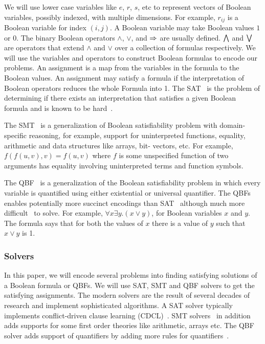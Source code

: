 \noindent We will use lower case variables like $e$, $r$, $s$, etc to represent vectors of
Boolean variables, possibly indexed, with multiple dimensions.
%
For example, $r_{ij}$ is a Boolean variable for index $(i,j)$.
%
%
A Boolean variable may take Boolean values $1$ or $0$.
%
The binary Boolean operators $\land$, $\lor$, and $\Rightarrow$ are usually defined.
%
$\bigwedge$ and $\bigvee$ are operators that extend $\land$ and $\lor$ over a collection of formulas respectively.
%
We will use the variables and operators to construct Boolean formulas to
encode our problems.
%
An assignment is a map from the variables in the formula to the Boolean values.
%
An assignment may satisfy a formula if the interpretation of Boolean operators reduces the whole Formula into 1.
%
The SAT~\cite{biere2009handbook} is the problem of determining if there exists an interpretation that satisfies a given Boolean formula and is known to be hard~\cite{cook1971complexity}.
%

The SMT~\cite{nieuwenhuis2006solving, barrett2018satisfiability} is a generalization of Boolean satisfiability problem with domain-specific reasoning, for example, support for uninterpreted functions, equality, arithmetic and data structures like arrays, bit-
vectors, etc.
%
For example, $f(f(u,v),v)=f(u,v)$ where $f$ is some unspecified function of two arguments has equality involving uninterpreted terms and function symbols.

%
The QBF~\cite{buning2009theory, benedetti2008qbf} is a generalization of the Boolean satisfiability problem in which every variable is quantified using either existential or universal quantifier.
%
The QBFs enables potentially more succinct encodings than SAT~\cite{jussila2007compressing} although much more difficult~\cite{savitch1970relationships, stockmeyer1973word} to solve.
For example, $\forall x \exists y. (x \lor y)$, for Boolean variables $x$ and $y$.
%
The formula says that for both the values of $x$ there is a value of $y$
such that $x \lor y$ is 1.
%
%

\subsubsection{Solvers}
In this paper, we will encode several problems into finding satisfying solutions of a Boolean formula or QBFs.
%
We will use SAT, SMT and QBF solvers to get the satisfying assignments.
%
The modern solvers are the result of several decades of research
and implement sophisticated algorithms.
%
%
A SAT solver typically implements conflict-driven clause learning (CDCL)~\cite{biere2009conflict}.
SMT solvers~\cite{barrett2018satisfiability} in addition adds supports for some first order theories like arithmetic, arrays etc.
% 
The QBF solver adds support of quantifiers by adding more rules for quantifiers~\cite{buning2009theory}.
%
%


